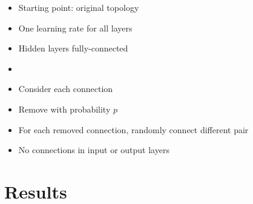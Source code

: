 \documentclass[pdf]{beamer}
\begin{document}
\begin{frame}
\begin{center}
		\end{center}
		\begin{itemize}
			\item<1|only@1> Starting point: original topology
			\item<1|only@1> One learning rate for all layers
		\end{itemize}
		\begin{itemize}
			\item<2|only@2> Hidden layers fully-connected
			\item<2|only@2>[]
		\end{itemize}
		\begin{itemize}
			\item<3|only@3> Consider each connection
			\item<3|only@3> Remove with probability $p$
		\end{itemize}
		\begin{itemize}
			\item<4|only@4> For each removed connection, randomly connect different pair
			\item<4|only@4> No connections in input or output layers
		\end{itemize}
\end{frame}

\section{Results}
\end{document}
